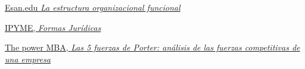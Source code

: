 \href{https://www.esan.edu.pe/conexion-esan/la-estructura-organizacional-funcional#:~:text=La%20estructura%20funcional%20es%20la,%2C%20producci%C3%B3n%2C%20ventas%2C%20etc.}{Esan.edu \textit{La estructura organizacional funcional}}

\href{http://www.ipyme.org/es-ES/DecisionEmprender/FormasJuridicas/Paginas/FormasJuridicas.aspx}{IPYME, \textit{Formas Jurídicas}}


\href{https://www.thepowermba.com/es/blog/las-5-fuerzas-de-porter#:~:text=Como%20hemos%20indicado%2C%20las%20cinco,sustitutivos%20y%20rivalidad%20entre%20competidores.}{The power MBA, \textit{Las 5 fuerzas de Porter: análisis de las fuerzas competitivas de una empresa}}